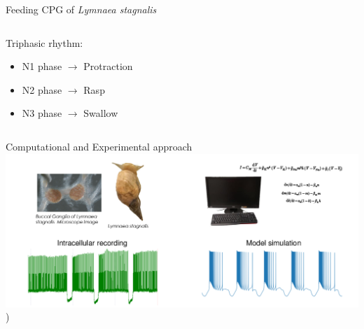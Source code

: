 \documentclass[aspectratio=43]{beamer}
\begin{document}
\begin{frame}{Feeding CPG of \textit{Lymnaea stagnalis}}
		\begin{columns}
			\begin{column}{0.45\textwidth}
				Triphasic rhythm:
				\begin{itemize}
					\item<1->{N1 phase $\rightarrow$ Protraction}
					\item<1->{N2 phase $\rightarrow$ Rasp}
					\item<1->{N3 phase $\rightarrow$ Swallow}
				\end{itemize}
			\end{column}
		\end{columns}
\end{frame}



\begin{frame}{Computational and Experimental approach}
	\includegraphics[width=\textwidth]{Images/experimental-computational.pdf})
\end{frame}
\end{document}

